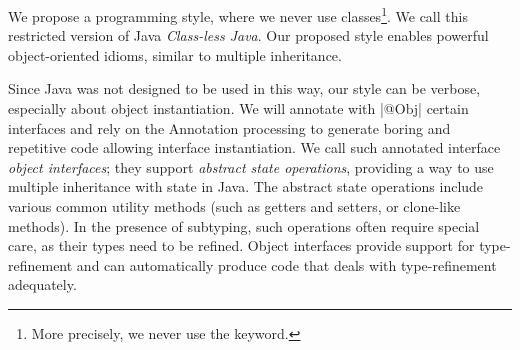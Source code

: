 %
%
%
%



We propose a programming style, where we never use classes\footnote{More precisely, we never use the \Q@class@ keyword.}.
We call this restricted version of Java \emph{Class-less Java}.
Our proposed style enables powerful object-oriented idioms, similar to 
multiple inheritance.

Since Java was not designed to be used in this way, our style can be verbose, especially about
object instantiation.
We will annotate with \Q|@Obj| certain interfaces and rely on
the Annotation processing to generate boring and repetitive code
allowing interface instantiation.
We call such annotated interface \emph{object interfaces};
they support \emph{abstract state operations}, providing a way
to use multiple inheritance with state in Java. The abstract state
operations include various common utility methods (such as getters and
setters, or clone-like methods). In the presence of subtyping, such
operations often require special care, as their types need to be
refined. Object interfaces provide support for type-refinement and can
automatically produce code that deals with type-refinement
adequately. %


